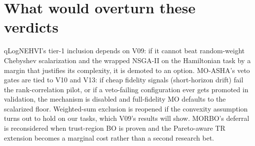 \section{What would overturn these verdicts}

qLogNEHVI's tier-1 inclusion depends on V09: if it cannot beat
random-weight Chebyshev scalarization and the wrapped NSGA-II on the
Hamiltonian task by a margin that justifies its complexity, it is
demoted to an option. MO-ASHA's veto gates are tied to V10 and V13:
if cheap fidelity signals (short-horizon drift) fail the
rank-correlation pilot, or if a veto-failing configuration ever gets
promoted in validation, the mechanism is disabled and full-fidelity
MO defaults to the scalarized floor. Weighted-sum exclusion is
reopened if the convexity assumption turns out to hold on our tasks,
which V09's results will show. MORBO's deferral is reconsidered when
trust-region BO is proven and the Pareto-aware TR extension becomes
a marginal cost rather than a second research bet.
